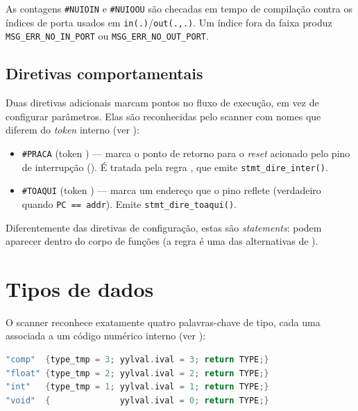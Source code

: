 \begin{nota}
As contagens \lstinline|#NUIOIN| e \lstinline|#NUIOOU| são checadas em tempo de
compilação contra os índices de porta usados em \lstinline|in(.)|/\lstinline|out(.,.)|.
Um índice fora da faixa produz \lstinline|MSG_ERR_NO_IN_PORT| ou
\lstinline|MSG_ERR_NO_OUT_PORT|.
\end{nota}

\subsection{Diretivas comportamentais}

Duas diretivas adicionais marcam pontos no fluxo de execução, em vez de
configurar parâmetros. Elas são reconhecidas pelo scanner com nomes que diferem
do \emph{token} interno (ver ):

\begin{itemize}[leftmargin=1.5em]
  \item \lstinline|#PRACA| (token ) --- marca o ponto de retorno
  para o \emph{reset} acionado pelo pino de interrupção (). É tratada
  pela regra , que emite \lstinline|stmt_dire_inter()|.
  \item \lstinline|#TOAQUI| (token ) --- marca um endereço que o
  pino  reflete (verdadeiro quando \texttt{PC == addr}). Emite
  \lstinline|stmt_dire_toaqui()|.
\end{itemize}

Diferentemente das diretivas de configuração, estas são \emph{statements}: podem
aparecer dentro do corpo de funções (a regra  é uma das
alternativas de ).

\section{Tipos de dados}
\label{sec:cmm-tipos}

O scanner reconhece exatamente quatro palavras-chave de tipo, cada uma associada
a um código numérico interno (ver ):

\begin{lstlisting}[language=C]
"comp"  {type_tmp = 3; yylval.ival = 3; return TYPE;}
"float" {type_tmp = 2; yylval.ival = 2; return TYPE;}
"int"   {type_tmp = 1; yylval.ival = 1; return TYPE;}
"void"  {              yylval.ival = 0; return TYPE;}
\end{lstlisting}


